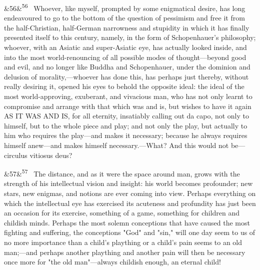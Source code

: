 \documentclass[12pt]{article}
\newcommand{\para}[1][]{\par\noindent\ifx&#1&\else\textsuperscript{\footnotesize #1}~\fi}
\begin{document}
\para[56] Whoever, like myself, prompted by some enigmatical desire, has long endeavoured to go to the bottom of the question of pessimism and free it from the half-Christian, half-German narrowness and stupidity in which it has finally presented itself to this century, namely, in the form of Schopenhauer's philosophy; whoever, with an Asiatic and super-Asiatic eye, has actually looked inside, and into the most world-renouncing of all possible modes of thought---beyond good and evil, and no longer like Buddha and Schopenhauer, under the dominion and delusion of morality,---whoever has done this, has perhaps just thereby, without really desiring it, opened his eyes to behold the opposite ideal: the ideal of the most world-approving, exuberant, and vivacious man, who has not only learnt to compromise and arrange with that which was and is, but wishes to have it again AS IT WAS AND IS, for all eternity, insatiably calling out da capo, not only to himself, but to the whole piece and play; and not only the play, but actually to him who requires the play---and makes it necessary; because he always requires himself anew---and makes himself necessary.---What? And this would not be---circulus vitiosus deus?

\para[57] The distance, and as it were the space around man, grows with the strength of his intellectual vision and insight: his world becomes profounder; new stars, new enigmas, and notions are ever coming into view. Perhaps everything on which the intellectual eye has exercised its acuteness and profundity has just been an occasion for its exercise, something of a game, something for children and childish minds. Perhaps the most solemn conceptions that have caused the most fighting and suffering, the conceptions "God" and "sin," will one day seem to us of no more importance than a child's plaything or a child's pain seems to an old man;---and perhaps another plaything and another pain will then be necessary once more for "the old man"---always childish enough, an eternal child!
\end{document}
